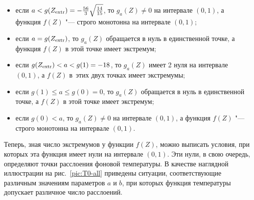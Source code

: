\begin{itemize}

   \item  если $a < g(Z_{\rm extr})=-\frac{56}{3}\sqrt{\frac{14}{15}}$, то $g_a(Z)\neq0$ на интервале $(0,1)$, а функция $f(Z)$ "--- строго монотонна на интервале $(0,1)$; 

    \item  если $a = g(Z_{\rm extr})$,  то $g_a(Z)$ обращается в нуль в единственной точке, а функция $f(Z)$ в этой точке имеет экстремум; 

    \item  если $g(Z_{\rm extr})<a<g(1)=-18$, то $g_a(Z)$ имеет 2 нуля на интервале $(0, 1)$, а $f(Z)$ в~этих двух точках имеет экстремумы; 

    \item  если $g(1)\leq a\leq g(0)=0$, то $g_a(Z)$ обращается в нуль в единственной точке, а $f(Z)$ в этой точке имеет экстремум; 

    \item  если $g(0)<a$, то $g_a(Z)\neq 0$ на интервале $(0, 1)$, а функция $f(Z)$ "--- строго монотонна  на интервале $(0, 1)$.






\end{itemize}



Теперь, зная число экстремумов у функции $f(Z)$, можно выписать условия, при которых эта функция имеет нули на интервале $(0, 1)$. Эти нули, в свою очередь, определяют точки расслоения фоновой температуры. В качестве наглядной иллюстрации на рис.~\ref{pic:T0-all} приведены ситуации, соответствующие различным значениям параметров $a$ и $b$, при которых функция температуры допускает различное число расслоений.












\smallskip





